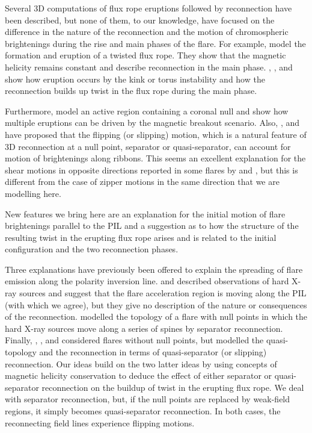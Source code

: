 \documentclass[10pt,namedreferneces]{SolarPhysics}
\begin{document}
\begin{article}
Several 3D computations of flux rope eruptions followed by reconnection have been described, but none of them, to our knowledge, have focused on the difference in the nature of the reconnection and the motion of chromospheric brightenings during the rise and main phases of the flare. For example,  model the formation and eruption of a twisted flux rope.  They show that the magnetic helicity remains constant and describe reconnection in the main phase. , ,  and  show how eruption occurs by the kink or torus instability and how the reconnection builds up twist in the flux rope during the main phase.

Furthermore,  model an active region containing a coronal null and show how multiple eruptions can be driven by the magnetic breakout scenario. Also, ,  and   have proposed that the flipping (or slipping) motion, which is a natural feature of 3D reconnection at a null point, separator or quasi-separator, can account for motion of brightenings along ribbons.  This seems an excellent explanation for the shear motions in opposite directions reported in some flares by  and , but this is different from the case of zipper motions in the same direction that we are modelling here.

New features we bring here are an explanation for the initial motion of flare brightenings parallel to the PIL and a suggestion as to how the structure of the resulting twist in the erupting flux rope arises and is related to the initial configuration and the two reconnection phases.

Three explanations have previously been offered to explain the spreading of flare emission along the polarity inversion line.  
 and  described observations of hard X-ray sources and suggest that the flare acceleration region is moving along the PIL (with which we agree), but they give no description of the nature or consequences of the reconnection.  modelled the topology of a flare with null points in which the hard X-ray sources move along a series of spines by separator reconnection. Finally, , ,  and  considered flares without null points, but modelled the quasi-topology and the reconnection in terms of quasi-separator (or slipping) reconnection.  Our ideas build on  the two latter ideas by using concepts of magnetic helicity conservation to deduce the effect of either separator or quasi-separator reconnection on the buildup of twist in the erupting flux rope. We deal with separator reconnection, but, if the null points are replaced by weak-field regions, it simply becomes quasi-separator reconnection. In both cases, the reconnecting field lines experience flipping motions.


\end{article}
\end{document}
